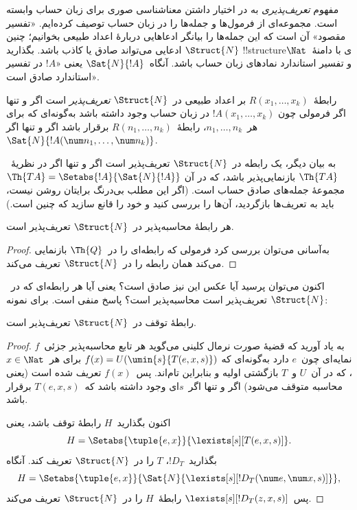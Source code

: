\documentclass[../../../include/open-logic-section]{subfiles}
\begin{document}


مفهوم \emph{تعریف‌پذیری} به در اختیار داشتن معناشناسی صوری برای زبان
حساب وابسته است. مجموعه‌ای از فرمول‌ها و جمله‌ها را در زبان حساب توصیف
کرده‌ایم. «تفسیر مقصود» آن است که این جمله‌ها را بیانگر ادعاهایی دربارهٔ
اعداد طبیعی بخوانیم؛ چنین ادعایی می‌تواند صادق یا کاذب باشد. بگذارید
$\Struct{N}$ !!{structure}ی با دامنهٔ~$\Nat$ و تفسیر استاندارد
نمادهای زبان حساب باشد. آنگاه~$\Sat{N}{!A}$ یعنی «$!A$ در تفسیر
استاندارد صادق است».

\begin{defn}
رابطهٔ~$R(x_1,\dots,x_k)$ بر اعداد طبیعی در~$\Struct{N}$
\emph{تعریف‌پذیر} است اگر و تنها اگر فرمولی چون
$!A(x_1,\dots,x_k)$ در زبان حساب وجود داشته باشد به‌گونه‌ای که برای
هر~$n_1,\dots,n_k$، رابطهٔ~$R(n_1,\dots,n_k)$ برقرار باشد اگر و تنها
اگر~$\Sat{N}{!A(\num n_1,\dots,\num n_k)}$.
\end{defn}

به بیان دیگر، یک رابطه در~$\Struct{N}$ تعریف‌پذیر است اگر و تنها اگر
در نظریهٔ~$\Th{TA}$ بازنمایی‌پذیر باشد، که در آن
$\Th{TA} = \Setabs{!A}{\Sat{N}{!A}}$ مجموعهٔ جمله‌های صادق حساب است.
(اگر این مطلب بی‌درنگ برایتان روشن نیست، باید به تعریف‌ها بازگردید،
آن‌ها را بررسی کنید و خود را قانع سازید که چنین است.)

\begin{lem}
هر رابطهٔ محاسبه‌پذیر در~$\Struct{N}$ تعریف‌پذیر است.
\end{lem}

\begin{proof}
به‌آسانی می‌توان بررسی کرد فرمولی که رابطه‌ای را در~$\Th{Q}$ بازنمایی
می‌کند همان رابطه را در~$\Struct{N}$ تعریف می‌کند.
\end{proof}

اکنون می‌توان پرسید آیا عکس این نیز صادق است؟ یعنی آیا هر رابطه‌ای که
در~$\Struct{N}$ تعریف‌پذیر است محاسبه‌پذیر است؟ پاسخ منفی است. برای
نمونه:

\begin{lem}
رابطهٔ توقف در~$\Struct{N}$ تعریف‌پذیر است.
\end{lem}

\begin{proof}
به یاد آورید که قضیهٔ صورت نرمال کلینی می‌گوید هر تابع محاسبه‌پذیر
جزئی~$f$ نمایه‌ای چون~$e$ دارد به‌گونه‌ای که
$f(x) = U(\umin{s}{T(e,x,s)})$ برای هر~$x \in \Nat$، که در آن~$U$ و~$T$ بازگشتی اولیه و
بنابراین تام‌اند. پس~$f(x)$ تعریف شده است (یعنی محاسبه متوقف می‌شود)
اگر و تنها اگر~$s$ای وجود داشته باشد که~$T(e,x,s)$ برقرار باشد.

اکنون بگذارید~$H$ رابطهٔ توقف باشد، یعنی
\[
H = \Setabs{\tuple{e,x}}{\lexists[s][T(e, x, s)]}.
\]
بگذارید~$!D_T$، $T$ را در~$\Struct{N}$ تعریف کند. آنگاه
\[
H = \Setabs{\tuple{e,x}}{\Sat{N}{\lexists[s][!D_T(\num e, \num x, s)]}},
\]
پس~$\lexists[s][!D_T(z, x, s)]$ رابطهٔ~$H$ را در~$\Struct{N}$ تعریف
می‌کند.
\end{proof}
\end{document}
